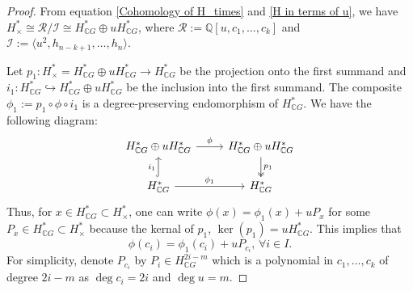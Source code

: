 \documentclass{amsart}
\begin{document}
	\begin{proof}
		From equation \eqref{Cohomology of H_times} and \eqref{H in terms of u}, we have $H^*_{\times}\cong \mathcal R/\mathcal I \cong H^*_{\mathbb{C}G} \oplus u H^*_{\mathbb{C}G}$, where $\mathcal R:=\mathbb Q[u,c_1,\ldots,c_k]$ and $\mathcal I:=\langle u^2, h_{n-k+1},\ldots,h_n\rangle$.
		
		Let $p_1: H^*_{\times} = H^*_{\mathbb{C}G} \oplus u H^*_{\mathbb{C}G} \to H^*_{\mathbb{C}G}$ be the projection onto the first summand and $i_1: H^*_{\mathbb{C}G} \hookrightarrow H^*_{\mathbb{C}G} \oplus u H^*_{\mathbb{C}G}$ be the inclusion into the first summand. The composite $\phi_1:= p_1 \circ \phi \circ i_1$ is a degree-preserving endomorphism of $H^*_{\mathbb{C}G}$. We have the following diagram:
		\begin{equation}\label{comm diagram}
			\begin{tikzcd}
				{H^*_{\mathbb CG}\oplus u H^*_{\mathbb CG}} & {H^*_{\mathbb CG} \oplus u H^*_{\mathbb CG}} \\
				{H^*_{\mathbb CG}} & {H^*_{\mathbb CG}}
				\arrow["\phi", from=1-1, to=1-2]
				\arrow["{p_1}", two heads, from=1-2, to=2-2]
				\arrow["{i_1}", hook, from=2-1, to=1-1]
				\arrow["{\phi_1}", from=2-1, to=2-2]
			\end{tikzcd}
		\end{equation}
		Thus, for  $x \in H^*_{\mathbb{C}G} \subset H^*_\times$, one can write
		$\phi(x) = \phi_1(x) + u P_x$
		for some $P_x \in H^*_{\mathbb{C}G} \subset H^*_\times$ because the kernal of $p_1$, $\ker(p_1) = u H^*_{\mathbb{C}G}$.
		This implies that \begin{equation}\label{defn of phi}
			\phi(c_i) = \phi_1(c_i) + u P_{c_i},\, \forall i \in I.
		\end{equation} For simplicity, denote $P_{c_i}$ by $P_i\in H^{2i-m}_{\mathbb CG}$ which is a polynomial in $c_1, \dots, c_k$ of degree $2i - m$ as $\deg c_i = 2i$ and $\deg u = m$.
		

\end{proof}
\end{document}

